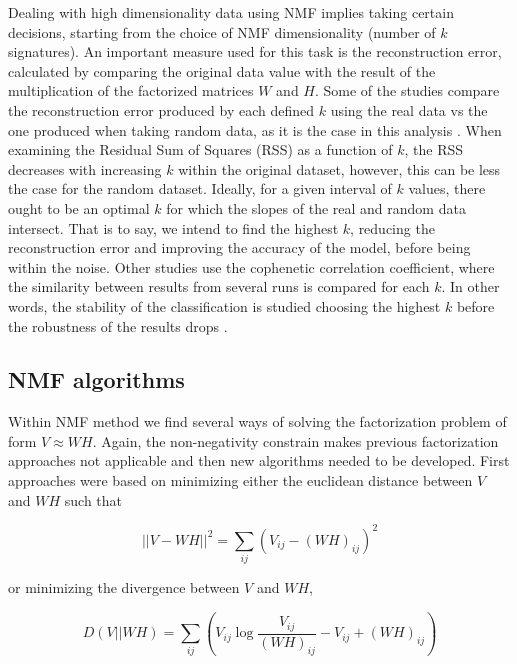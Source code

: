Dealing with high dimensionality data using NMF implies taking certain decisions, starting from the choice of NMF dimensionality (number of \(k\) signatures). An important measure used for this task is the reconstruction error, calculated by comparing the original data value with the result of the multiplication of the factorized matrices \(W\) and \(H\). Some of the studies compare the reconstruction error produced by each defined \(k\) using the real data vs the one produced when taking random data, as it is the case in this analysis \cite{Frigyesi2008}. When examining the Residual Sum of Squares (RSS) as a function of \(k\), the RSS decreases with increasing \(k\) within the original dataset, however, this can be less the case for the random dataset. Ideally, for a given interval of \(k\) values, there ought to be an optimal \(k\) for which the slopes of the real and random data intersect. That is to say, we intend to find the highest \(k\), reducing the reconstruction error and improving the accuracy of the model, before being within the noise. Other studies use the cophenetic correlation coefficient, where the similarity between results from several runs is compared for each \(k\). In other words, the stability of the classification is studied choosing the highest \(k\) before the robustness of the results drops \cite{Brunet2004}.

\subsection{NMF algorithms}\label{NMFalgs}

Within NMF method we find several ways of solving the factorization problem of form \(V \approx W H\). Again, the non-negativity constrain makes previous factorization approaches not applicable and then new algorithms needed to be developed. First approaches \cite{Lee2001} were based on minimizing either the euclidean distance between \(V\) and \(WH\) such that

\begin{equation}
    \vert \vert V - WH \vert \vert ^2 = \sum_{ij} (V_{ij} - (WH)_{ij})^2
\end{equation}

or minimizing the divergence between \(V\) and \(WH\),

\begin{equation}
    D(V \vert \vert WH) = \sum_{ij}\left(V_{ij} \log \frac{V_{ij}}{(WH)_{ij}} - V_{ij} + (WH)_{ij} \right)
\end{equation}


